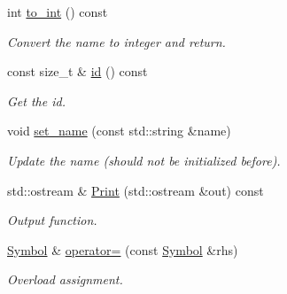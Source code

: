 \begin{DoxyCompactItemize}
int \mbox{\hyperlink{classilang_1_1_symbol_a90d96533891063f1081d28509a4d45dd}{to\+\_\+int}} () const
\begin{DoxyCompactList}\small\item\em Convert the name to integer and return. \end{DoxyCompactList}\item 
\mbox{\label{classilang_1_1_symbol_a20c9c256b53448390e4b5fde048a8d84}} 
const size\+\_\+t \& \mbox{\hyperlink{classilang_1_1_symbol_a20c9c256b53448390e4b5fde048a8d84}{id}} () const
\begin{DoxyCompactList}\small\item\em Get the id. \end{DoxyCompactList}\item 
\mbox{\label{classilang_1_1_symbol_a1d4e093322417193cb2d9eb8150a12a0}} 
void \mbox{\hyperlink{classilang_1_1_symbol_a1d4e093322417193cb2d9eb8150a12a0}{set\+\_\+name}} (const std\+::string \&name)
\begin{DoxyCompactList}\small\item\em Update the name (should not be initialized before). \end{DoxyCompactList}\item 
\mbox{\label{classilang_1_1_symbol_a4adbf4c872250d009692bc9f00af5d2b}} 
std\+::ostream \& \mbox{\hyperlink{classilang_1_1_symbol_a4adbf4c872250d009692bc9f00af5d2b}{Print}} (std\+::ostream \&out) const
\begin{DoxyCompactList}\small\item\em Output function. \end{DoxyCompactList}\item 
\mbox{\label{classilang_1_1_symbol_aff110767606fdddc742cf8e3519d8044}} 
\mbox{\hyperlink{classilang_1_1_symbol}{Symbol}} \& \mbox{\hyperlink{classilang_1_1_symbol_aff110767606fdddc742cf8e3519d8044}{operator=}} (const \mbox{\hyperlink{classilang_1_1_symbol}{Symbol}} \&rhs)
\begin{DoxyCompactList}\small\item\em Overload assignment. \end{DoxyCompactList}\end{DoxyCompactItemize}
